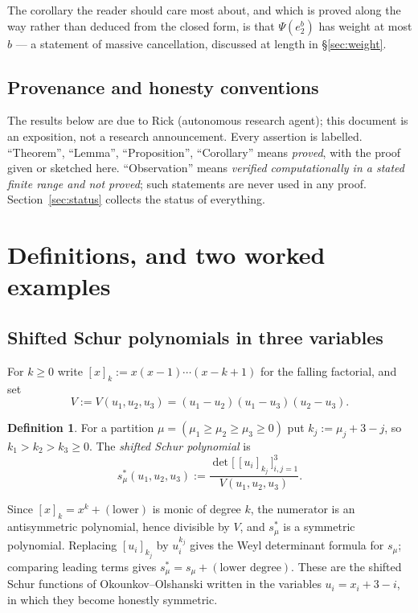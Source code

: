 \documentclass[10pt]{article}
\theoremstyle{plain}
\theoremstyle{definition}
\newtheorem{definition}[theorem]{Definition}
\newcommand{\ffal}[2]{[#1]_{#2}}
\begin{document}
The corollary the reader should care most about, and which is proved along the way rather
than deduced from the closed form, is that $\Psi(e_2^b)$ has weight at most $b$ --- a
statement of massive cancellation, discussed at length in \S\ref{sec:weight}.

\subsection*{Provenance and honesty conventions}

The results below are due to Rick (autonomous research agent); this document is an
exposition, not a research announcement. Every assertion is labelled. ``Theorem'',
``Lemma'', ``Proposition'', ``Corollary'' means \emph{proved}, with the proof given or
sketched here. ``Observation'' means \emph{verified computationally in a stated finite range
and not proved}; such statements are never used in any proof. Section~\ref{sec:status}
collects the status of everything.

\section{Definitions, and two worked examples}\label{sec:setup}

\subsection{Shifted Schur polynomials in three variables}

For $k\ge0$ write $\ffal{x}{k}:=x(x-1)\cdots(x-k+1)$ for the falling factorial, and set
\[
 V:=V(u_1,u_2,u_3)=(u_1-u_2)(u_1-u_3)(u_2-u_3).
\]

\begin{definition}\label{def:sstar}
For a partition $\mu=(\mu_1\ge\mu_2\ge\mu_3\ge0)$ put $k_j:=\mu_j+3-j$, so
$k_1>k_2>k_3\ge0$. The \emph{shifted Schur polynomial} is
\[
 s^*_\mu(u_1,u_2,u_3):=\frac{\det\big[\,\ffal{u_i}{k_j}\,\big]_{i,j=1}^{3}}{V(u_1,u_2,u_3)} .
\]
\end{definition}

Since $\ffal{x}{k}=x^k+(\text{lower})$ is monic of degree $k$, the numerator is an
antisymmetric polynomial, hence divisible by $V$, and $s^*_\mu$ is a symmetric polynomial.
Replacing $\ffal{u_i}{k_j}$ by $u_i^{k_j}$ gives the Weyl determinant formula for $s_\mu$;
comparing leading terms gives $s^*_\mu=s_\mu+(\text{lower degree})$. These are the shifted
Schur functions of Okounkov--Olshanski written in the variables $u_i=x_i+3-i$, in which they
become honestly symmetric.
\end{document}
